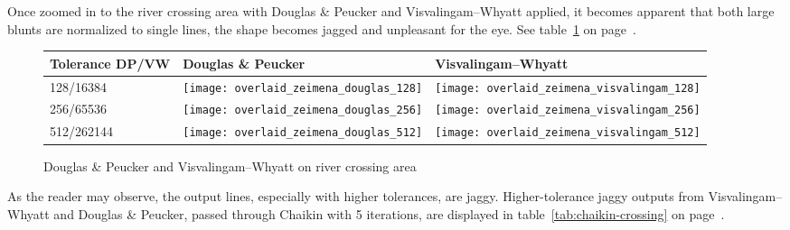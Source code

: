 \documentclass[a4paper]{article}
\newcommand{\DP}{Douglas \& Peucker}
\newcommand{\VW}{Visvalingam--Whyatt}
\begin{document}
Once zoomed in to the river crossing area with {\DP} and {\VW} applied, it
becomes apparent that both large blunts are normalized to single lines, the
shape becomes jagged and unpleasant for the eye. See
table~\ref{tab:comparison-crossing} on page~\pageref{tab:comparison-crossing}.

\begin{figure}[h]
    \renewcommand{\tabularxcolumn}[1]{>{\center\small}m{#1}}
    \begin{tabularx}{\textwidth}{ p{2.1cm} | X | X | }
        Tolerance DP/VW                                                      &
        {\DP}                                                                &
        {\VW}                                                                \tabularnewline \hline

        128/16384                                                            &
        \texttt{[image: overlaid\_zeimena\_douglas\_128]}     &
        \texttt{[image: overlaid\_zeimena\_visvalingam\_128]} \tabularnewline \hline

        256/65536                                                            &
        \texttt{[image: overlaid\_zeimena\_douglas\_256]}     &
        \texttt{[image: overlaid\_zeimena\_visvalingam\_256]} \tabularnewline \hline

        512/262144                                                            &
        \texttt{[image: overlaid\_zeimena\_douglas\_512]}      &
        \texttt{[image: overlaid\_zeimena\_visvalingam\_512]}  \tabularnewline \hline

    \end{tabularx}
    \caption{{\DP} and {\VW} on river crossing area}
    \label{tab:comparison-crossing}
\end{figure}

As the reader may observe, the output lines, especially with higher tolerances,
are jaggy. Higher-tolerance jaggy outputs from {\VW} and {\DP}, passed through
Chaikin with 5 iterations, are displayed in table~\ref{tab:chaikin-crossing} on
page~\pageref{tab:chaikin-crossing}.
\end{document}
